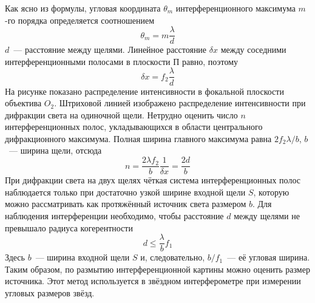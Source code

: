 Как ясно из формулы, угловая координата $ \theta_{m}$ интерференционного максимума $m$-го порядка определяется соотношением
\[
    \theta_{m} = m\frac{ \lambda}{d}
\]
$d$~--- расстояние между щелями. Линейное расстояние $\delta x$ между соседними интерференционными полосами в плоскости П равно, поэтому
\[
    \delta x = f_{2} \frac{\lambda}{d}
\]
На рисунке показано распределение интенсивности в фокальной плоскости объектива $O_{2}$. Штриховой линией изображено распределение интенсивности при дифракции света на одиночной щели. Нетрудно оценить число $n$ интерференционных полос, укладывающихся в области центрального дифракционного максимума. Полная ширина главного максимума равна $2f_{2} \lambda / b$, $b$~--- ширина щели, отсюда
\[
    n = \frac{2\lambda f_{2}}{b}\frac{1}{\delta x} = \frac{2d}{b}
\]
При дифракции света на двух щелях чёткая система интерференционных полос наблюдается только при достаточно узкой ширине входной щели $S$, которую можно рассматривать как протяжённый источник света размером $b$. Для наблюдения интерференции необходимо, чтобы расстояние $d$ между щелями не превышало радиуса когерентности
\[
    d \le \frac{\lambda}{b}f_{1}
\]
Здесь $b$~--- ширина входной щели $S$ и, следовательно, $b/f_{1}$~--- её угловая ширина. Таким образом, по размытию интерференционной картины можно оценить размер источника. Этот метод используется в звёздном интерферометре при измерении угловых размеров звёзд.
